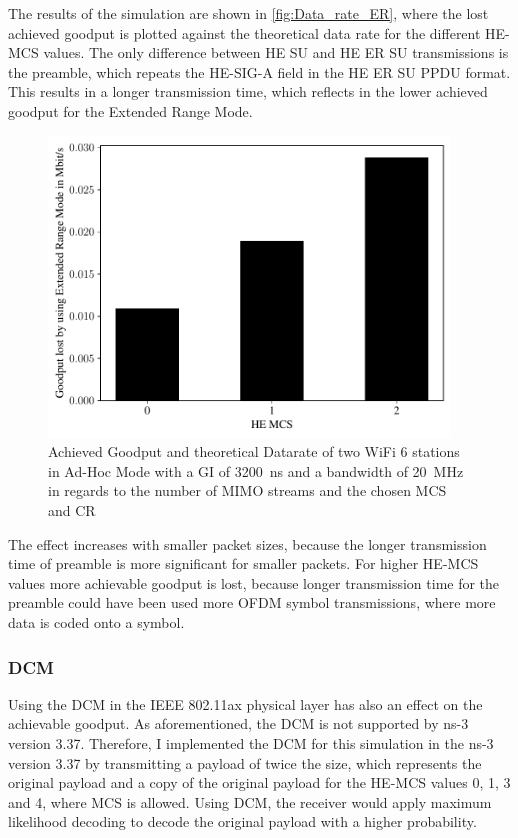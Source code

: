 The results of the simulation are shown in \autoref{fig:Data_rate_ER}, where the lost achieved goodput is plotted against the theoretical data rate for the different HE-\ac{MCS} values.
The only difference between HE SU and HE ER SU transmissions is the preamble, which repeats the HE-SIG-A field in the HE ER SU PPDU format.
This results in a longer transmission time, which reflects in the lower achieved goodput for the Extended Range Mode.
\begin{figure}[H]%
	\centering
	\includegraphics[width=0.95\textwidth]{figures/ER_dataRate_simulation.pdf}
	\caption{Achieved Goodput and theoretical Datarate of two WiFi 6 stations in Ad-Hoc Mode with a \ac{GI} of \SI{3200}{\nano\second} and a bandwidth of \SI{20}{\mega\hertz} in regards to the number of \ac{MIMO} streams and the chosen \ac{MCS} and \ac{CR}}%
	\label{fig:Data_rate_ER}%
\end{figure}
The effect increases with smaller packet sizes, because the longer transmission time of preamble is more significant for smaller packets.
For higher HE-\ac{MCS} values more achievable goodput is lost, because longer transmission time for the preamble could have
been used more \ac{OFDM} symbol transmissions, where more data is coded onto a symbol.


\subsubsection*{\acf{DCM}}
Using the \ac{DCM} in the IEEE 802.11ax physical layer has also an effect on the achievable goodput.
As aforementioned, the \ac{DCM} is not supported by ns-3 version 3.37.
Therefore, I implemented the \ac{DCM} for this simulation in the ns-3 version 3.37 by transmitting a payload of twice the size, which represents the original payload and a
copy of the original payload for the HE-\ac{MCS} values 0, 1, 3 and 4, where \ac{MCS} is allowed.
Using \ac{DCM}, the receiver would apply maximum likelihood decoding to decode the original payload with a higher probability.

